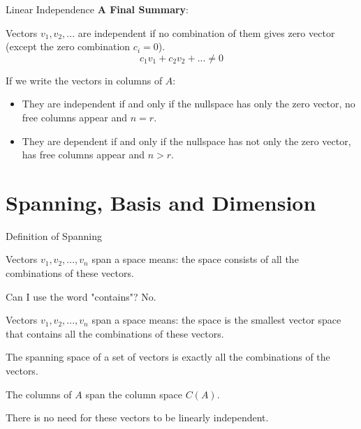 \documentclass{beamer}
\begin{document}
\begin{frame}{Linear Independence}
\textbf{A Final Summary}:

\vspace{5pt}
Vectors $v_1, v_2, ...$ are independent if no combination of them gives zero vector (except the zero combination $c_i=0$).
\vspace{-8pt}
\begin{equation*}
    c_1v_1+c_2v_2+...\ne0
\end{equation*}

If we write the vectors in columns of $A$:
\begin{itemize}
    \item They are independent if and only if the nullspace has only the zero vector, no free columns appear and $n=r$.
    \item They are dependent if and only if the nullspace has not only the zero vector, has free columns appear and $n>r$.
\end{itemize}
\end{frame}

\section{Spanning, Basis and Dimension}
\begin{frame}{Definition of Spanning}
\begin{definition}
Vectors $v_1,v_2,...,v_n$ span a space means: the space \alert{consists of} all the combinations of these vectors.
\end{definition}

Can I use the word "contains"? No.

\vspace{3pt}
Vectors $v_1,v_2,...,v_n$ span a space means: the space is the smallest vector space that \alert{contains} all the combinations of these vectors.

\vspace{3pt}
The spanning space of a set of vectors is exactly all the combinations of the vectors.

\vspace{3pt}
The columns of $A$ span the column space $C(A)$.

\vspace{3pt}
There is no need for these vectors to be linearly independent.

\end{frame}
\end{document}
